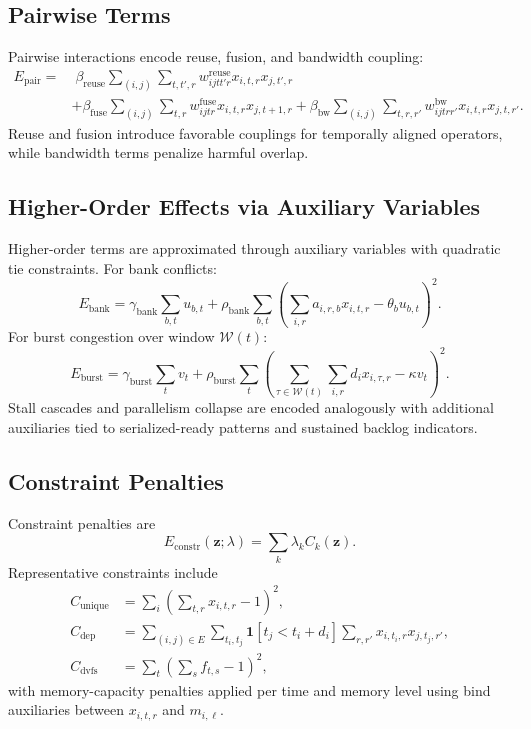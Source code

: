 \documentclass{article}
\begin{document}
\subsection{Pairwise Terms}
Pairwise interactions encode reuse, fusion, and bandwidth coupling:
\begin{align}
E_{\text{pair}} =
&\;\beta_{\mathrm{reuse}}\sum_{(i,j)}\sum_{t,t',r} w^{\mathrm{reuse}}_{ijtt'r}x_{i,t,r}x_{j,t',r} \\
&+ \beta_{\mathrm{fuse}}\sum_{(i,j)}\sum_{t,r} w^{\mathrm{fuse}}_{ijtr}x_{i,t,r}x_{j,t+1,r}
+ \beta_{\mathrm{bw}}\sum_{(i,j)}\sum_{t,r,r'} w^{\mathrm{bw}}_{ijtrr'}x_{i,t,r}x_{j,t,r'}.
\end{align}
Reuse and fusion introduce favorable couplings for temporally aligned operators, while bandwidth terms penalize harmful overlap.

\subsection{Higher-Order Effects via Auxiliary Variables}
Higher-order terms are approximated through auxiliary variables with quadratic tie constraints. For bank conflicts:
\begin{equation}
E_{\mathrm{bank}} = \gamma_{\mathrm{bank}}\sum_{b,t}u_{b,t} + \rho_{\mathrm{bank}}\sum_{b,t}\left(\sum_{i,r} a_{i,r,b}x_{i,t,r} - \theta_b u_{b,t}\right)^2.
\end{equation}
For burst congestion over window $\mathcal{W}(t)$:
\begin{equation}
E_{\mathrm{burst}} = \gamma_{\mathrm{burst}}\sum_t v_t + \rho_{\mathrm{burst}}\sum_t\left(\sum_{\tau\in\mathcal{W}(t)}\sum_{i,r} d_i x_{i,\tau,r} - \kappa v_t\right)^2.
\end{equation}
Stall cascades and parallelism collapse are encoded analogously with additional auxiliaries tied to serialized-ready patterns and sustained backlog indicators.

\subsection{Constraint Penalties}
Constraint penalties are
\begin{equation}
E_{\text{constr}}(\mathbf{z};\lambda) = \sum_k \lambda_k C_k(\mathbf{z}).
\end{equation}
Representative constraints include
\begin{align}
C_{\mathrm{unique}} &= \sum_i \left(\sum_{t,r}x_{i,t,r}-1\right)^2, \\
C_{\mathrm{dep}} &= \sum_{(i,j)\in E}\sum_{t_i,t_j}\mathbf{1}[t_j < t_i + d_i] \sum_{r,r'}x_{i,t_i,r}x_{j,t_j,r'}, \\
C_{\mathrm{dvfs}} &= \sum_t\left(\sum_s f_{t,s}-1\right)^2,
\end{align}
with memory-capacity penalties applied per time and memory level using bind auxiliaries between $x_{i,t,r}$ and $m_{i,\ell}$.
\end{document}
